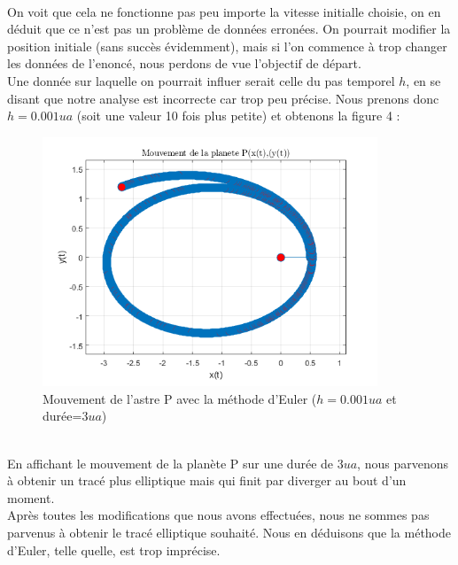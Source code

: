 \documentclass[11pt]{article} %
\begin{document}
\\On voit que cela ne fonctionne pas peu importe la vitesse initialle choisie, on en déduit que ce n'est pas un problème de données erronées. On pourrait modifier la position initiale (sans succès évidemment), mais si l'on commence à trop changer les données de l'enoncé, nous perdons de vue l'objectif de départ.\\
Une donnée sur laquelle on pourrait influer serait celle du pas temporel $h$, en se disant que notre analyse est incorrecte car trop peu précise. Nous prenons donc $h=0.001 ua$ (soit une valeur 10 fois plus petite) et obtenons la figure 4 :
\begin{figure}[h]
\includegraphics[width=10cm]{fig_euler_h0p001}
\centering
\caption{Mouvement de l'astre P avec la méthode d'Euler ($h=0.001 ua$ et durée=$3ua$)}
\end{figure}
\\ En affichant le mouvement de la planète P sur une durée de $3ua$, nous parvenons à obtenir un tracé plus elliptique mais qui finit par diverger au bout d'un moment. \\
Après toutes les modifications que nous avons effectuées, nous ne sommes pas parvenus à obtenir le tracé elliptique souhaité. Nous en déduisons que la méthode d'Euler, telle quelle, est trop imprécise.
\clearpage
\end{document}
